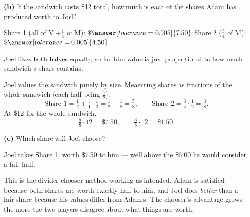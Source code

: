 \documentclass[12pt]{ximera}
\begin{document}
\begin{problem}
\begin{prompt}
\textbf{(b)} If the sandwich costs \$12 total, how much is each of the shares Adam has
produced worth to Joel?

Share 1 (all of V $+\frac14$ of M): $\$\answer[tolerance=0.005]{7.50}$ \qquad
Share 2 ($\frac34$ of M): $\$\answer[tolerance=0.005]{4.50}$

\begin{hint}
Joel likes both halves equally, so for him value is just proportional to how much
sandwich a share contains.
\end{hint}

\begin{solution}
Joel values the sandwich purely by size. Measuring shares as fractions of the whole
sandwich (each half being $\frac12$):
\[
\text{Share 1} = \tfrac12 + \tfrac14\cdot\tfrac12 = \tfrac12+\tfrac18 = \tfrac58,
\qquad
\text{Share 2} = \tfrac34\cdot\tfrac12 = \tfrac38.
\]
At \$12 for the whole sandwich,
\[
\tfrac58 \cdot 12 = \$7.50, \qquad \tfrac38\cdot 12 = \$4.50.
\]
\end{solution}
\end{prompt}

\begin{prompt}
\textbf{(c)} Which share will Joel choose?

\begin{multipleChoice}
\end{multipleChoice}

\begin{solution}
Joel takes Share 1, worth \$7.50 to him --- well above the \$6.00 he would consider a
fair half.

This is the divider-chooser method working as intended. Adam is satisfied because both
shares are worth exactly half to him, and Joel does \emph{better} than a fair share
because his values differ from Adam's. The chooser's advantage grows the more the two
players disagree about what things are worth.
\end{solution}
\end{prompt}
\end{problem}
\end{document}

